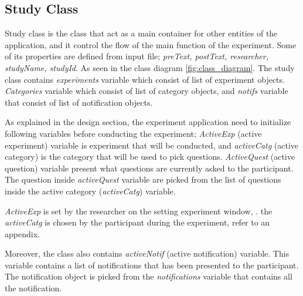 \subsection{Study Class}
Study class is the class that act as a main container for other entities of the application, and it control the flow of the main function of the experiment.
Some of its properties are defined from input file; \textit{preText, postText, researcher, studyName, studyId}.
As seen in the class diagram \ref{fig:class_diagram}. The study class contains \textit{experiments} variable which consist of list of experiment objects.
 \textit{Categories} variable which consist of list of category objects, and \textit{notifs} variable that consist of list of notification objects.

As explained in the design section,
the experiment application need to initialize following variables before conducting the experiment;
\textit{ActiveExp} (active experiment) variable is experiment that will be conducted, and \textit{activeCatg} (active category) is the
category that will be used to pick questions.
\textit{ActiveQuest} (active question) variable present what questions are currently asked to the participant.
The question inside \textit{activeQuest} variable are picked from the list of questions inside the active category (\textit{activeCatg}) variable.

\textit{ActiveExp} is set by the researcher on the setting experiment window, .
the \textit{activeCatg} is chosen by the participant during the experiment, refer to an appendix.




Moreover, the class also contains \textit{activeNotif} (active notification) variable.
This variable contains a list of notifications that has been presented to the participant.
The notification object is picked from the \textit{notifications} variable that contains all the notification.

